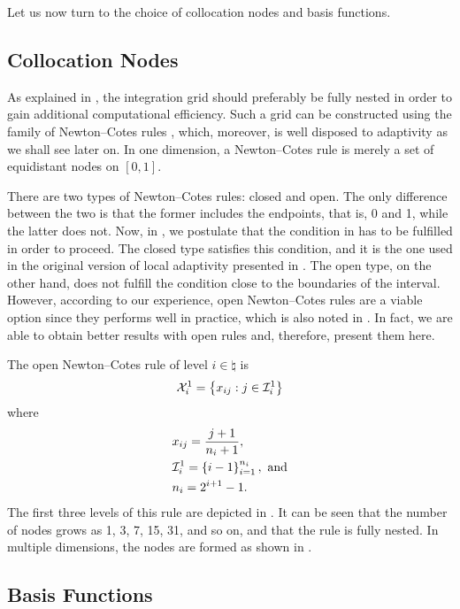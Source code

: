 Let us now turn to the choice of collocation nodes and basis functions.

\subsection{Collocation Nodes}

As explained in , the integration grid should
preferably be fully nested in order to gain additional computational efficiency.
Such a grid can be constructed using the family of Newton--Cotes rules
\cite{ma2009}, which, moreover, is well disposed to adaptivity as we shall see
later on. In one dimension, a Newton--Cotes rule is merely a set of equidistant
nodes on $[0, 1]$.

There are two types of Newton--Cotes rules: closed and open. The only difference
between the two is that the former includes the endpoints, that is, 0 and 1,
while the latter does not. Now, in , we postulate
that the condition in  has to be fulfilled in
order to proceed. The closed type satisfies this condition, and it is the one
used in the original version of local adaptivity presented in \cite{ma2009}. The
open type, on the other hand, does not fulfill the condition close to the
boundaries of the interval. However, according to our experience, open
Newton--Cotes rules are a viable option since they performs well in practice,
which is also noted in \cite{klimke2006}. In fact, we are able to obtain better
results with open rules and, therefore, present them here.

The open Newton--Cotes rule of level $i \in \natural$ is
\[
  \mathcal{X}^1_i = \left\{ x_{ij}: j \in \mathcal{I}^{1}_{i} \right\}
\]
where
\begin{align*}
  & x_{ij} = \frac{j + 1}{n_i + 1}, \\
  & \mathcal{I}^{1}_{i} = \left\{ i - 1 \right\}_{i = 1}^{n_i}, \text{ and} \\
  & n_i = 2^{i + 1} - 1.
\end{align*}
The first three levels of this rule are depicted in . It
can be seen that the number of nodes grows as 1, 3, 7, 15, 31, and so on, and
that the rule is fully nested. In multiple dimensions, the nodes are formed as
shown in .

\subsection{Basis Functions}

